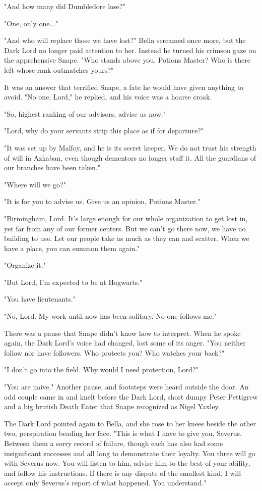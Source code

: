 \documentclass[a4paper,11pt]{article}
\begin{document}
"And how many did Dumbledore lose?"

"One, only one..."

"And who will replace those we have lost?" Bella screamed once more, but the Dark Lord no longer paid attention to her. Instead he turned his crimson gaze on the apprehensive Snape. "Who stands above you, Potions Master? Who is there left whose rank outmatches yours?"

It was an answer that terrified Snape, a fate he would have given anything to avoid. "No one, Lord," he replied, and his voice was a hoarse croak.

"So, highest ranking of our advisors, advise us now."

"Lord, why do your servants strip this place as if for departure?"

"It was set up by Malfoy, and he is its secret keeper. We do not trust his strength of will in Azkaban, even though dementors no longer staff it. All the guardians of our branches have been taken."

"Where will we go?"

"It is for you to advise us. Give us an opinion, Potions Master."

"Birmingham, Lord. It's large enough for our whole organization to get lost in, yet far from any of our former centers. But we can't go there now, we have no building to use. Let our people take as much as they can and scatter. When we have a place, you can summon them again."

"Organize it."

"But Lord, I'm expected to be at Hogwarts."

"You have lieutenants."

"No, Lord. My work until now has been solitary. No one follows me."

There was a pause that Snape didn't know how to interpret. When he spoke again, the Dark Lord's voice had changed, lost some of its anger. "You neither follow nor have followers. Who protects you? Who watches your back?"

"I don't go into the field. Why would I need protection, Lord?"

"You are naive." Another pause, and footsteps were heard outside the door. An odd couple came in and knelt before the Dark Lord, short dumpy Peter Pettigrew and a big brutish Death Eater that Snape recognized as Nigel Yaxley.

The Dark Lord pointed again to Bella, and she rose to her knees beside the other two, perspiration beading her face. "This is what I have to give you, Severus. Between them a sorry record of failure, though each has also had some insignificant successes and all long to demonstrate their loyalty. You three will go with Severus now. You will listen to him, advise him to the best of your ability, and follow his instructions. If there is any dispute of the smallest kind, I will accept only Severus's report of what happened. You understand."
\end{document}
